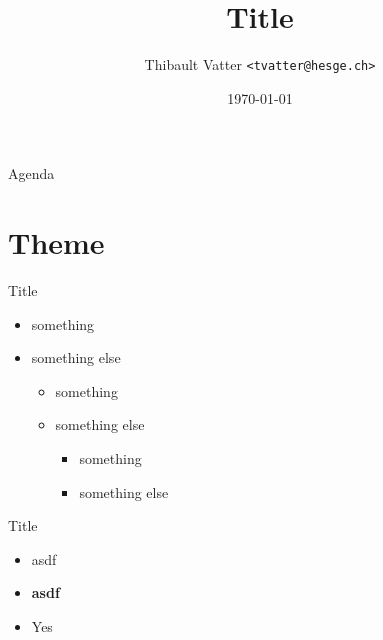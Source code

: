 \documentclass[11pt]{beamer}
\title{Title}
\institute{University of Applied Sciences Western Switzerland}
\date{\today}
\author[T.~Vatter]{Thibault Vatter \texttt{<tvatter@hesge.ch>}}
\begin{document}

{ %
\begin{frame}[noframenumbering] 
	\titlepage
\end{frame}
}


\begin{frame}{Agenda}
	\tableofcontents
\end{frame}


\section{Theme}


\begin{frame}{Title}

	\begin{itemize}
		\item something
		\item something else
		\begin{itemize}
      \item something
		  \item something else
      \begin{itemize}
        \item something
        \item something else
      \end{itemize}
    \end{itemize}
	\end{itemize}
\end{frame}


\begin{frame}{Title}

	\begin{itemize}
		\item asdf  
		\item  \textbf{asdf}  
		\item[\cmark] Yes
	\end{itemize}
\end{frame}
\end{document}
